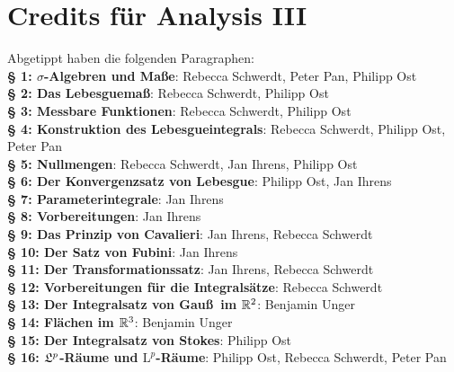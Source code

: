\documentclass[a4paper,twoside,DIV15,BCOR12mm,chapterprefix=true,headings=onelinechapter]{scrbook}
\begin{document}
\chapter{Credits für Analysis III} Abgetippt haben die folgenden Paragraphen:\\%
\textbf{§ 1: $\sigma$-Algebren und Maße}: Rebecca Schwerdt, Peter Pan, Philipp Ost\\
\textbf{§ 2: Das Lebesguemaß}: Rebecca Schwerdt, Philipp Ost\\
\textbf{§ 3: Messbare Funktionen}: Rebecca Schwerdt, Philipp Ost\\
\textbf{§ 4: Konstruktion des Lebesgueintegrals}: Rebecca Schwerdt, Philipp Ost, Peter Pan\\
\textbf{§ 5: Nullmengen}: Rebecca Schwerdt, Jan Ihrens, Philipp Ost\\
\textbf{§ 6: Der Konvergenzsatz von Lebesgue}: Philipp Ost, Jan Ihrens \\
\textbf{§ 7: Parameterintegrale}: Jan Ihrens \\
\textbf{§ 8: Vorbereitungen}: Jan Ihrens \\
\textbf{§ 9: Das Prinzip von Cavalieri}: Jan Ihrens, Rebecca Schwerdt\\
\textbf{§ 10: Der Satz von Fubini}: Jan Ihrens\\
\textbf{§ 11: Der Transformationssatz}: Jan Ihrens, Rebecca Schwerdt\\
\textbf{§ 12: Vorbereitungen für die Integralsätze}: Rebecca Schwerdt\\
\textbf{§ 13: Der Integralsatz von Gau\ss \ im \(\mathbb{R}^{2}\)}: Benjamin Unger\\ 
\textbf{§ 14: Flächen im \(\mathbb{R}^{3}\)}: Benjamin Unger\\
\textbf{§ 15: Der Integralsatz von Stokes}: Philipp Ost\\
\textbf{§ 16: \(\mathfrak{L}^{p}\)-Räume und \(\mathrm{L}^{p}\)-Räume}: Philipp Ost, Rebecca Schwerdt, Peter Pan \\
\end{document}
